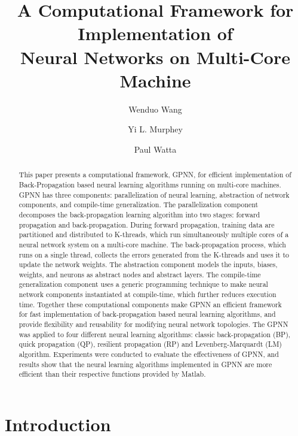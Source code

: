\documentclass[procedia]{easychair}
\title{A Computational Framework for Implementation of\\
       Neural Networks on Multi-Core Machine}
\author{
    Wenduo Wang\inst{1}
\and
    Yi L. Murphey\inst{1}
\and
    Paul Watta\inst{1}
}
\institute{
    University of Michigan-Dearborn,
    Dearborn, Michigan, U.S.A\\
    \email{wenduow@umich.edu}
    \email{yilu@umich.edu}
    \email{watta@umich.edu}
}
\begin{document}
\maketitle


\begin{abstract}

This paper presents a computational framework, GPNN, for efficient implementation of Back-Propagation based neural learning algorithms running on multi-core machines.  GPNN has three components: parallelization of neural learning, abstraction of network components, and compile-time generalization.  The parallelization component decomposes the back-propagation learning algorithm into two stages: forward propagation and back-propagation.  During forward propagation, training data are partitioned and distributed to K-threads, which run simultaneously multiple cores of a neural network system on a multi-core machine. The back-propagation process, which runs on a single thread, collects the errors generated from the K-threads and uses it to update the network weights.  The abstraction component models the inputs, biases, weights, and neurons as abstract nodes and abstract layers.  The compile-time generalization component uses a generic programming technique to make neural network components instantiated at compile-time, which further reduces execution time. Together these computational components make GPNN an efficient framework for fast implementation of back-propagation based neural learning algorithms, and provide flexibility and reusability for modifying neural network topologies.  The GPNN was applied to four different neural learning algorithms: classic back-propagation (BP), quick propagation (QP), resilient propagation (RP) and Levenberg-Marquardt (LM) algorithm. Experiments were conducted to evaluate the effectiveness of GPNN, and results show that the neural learning algorithms implemented in GPNN are more efficient than their respective functions provided by Matlab.

\end{abstract}


\section{Introduction}
\end{document}
